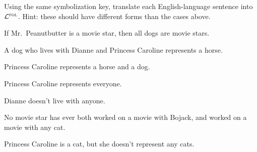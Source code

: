 \problempart
\label{pr.$\FOL$bojackother}
Using the same symbolization key, translate each English-language sentence into $\FOL$. Hint: these should have different forms than the cases above.
\begin{earg}
\item If Mr.\ Peanutbutter is a movie star, then all dogs are movie stars.
\item A dog who lives with Dianne and Princess Caroline represents a horse.
\item Princess Caroline represents a horse and a dog.
\item Princess Caroline represents everyone.
\item Dianne doesn't live with anyone.
\item No movie star has ever both worked on a movie with Bojack, and worked on a movie with any cat.
\item Princess Caroline is a cat, but she doesn't represent any cats.
\end{earg}




